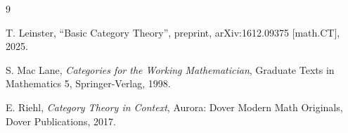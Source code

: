
{}
\begin{thebibliography}{9}

T. Leinster,
``Basic Category Theory'',
preprint, arXiv:1612.09375 [math.CT], 2025.

S. Mac Lane,
\textit{Categories for the Working Mathematician},
Graduate Texts in Mathematics 5, Springer-Verlag, 1998.

E. Riehl,
\textit{Category Theory in Context},
Aurora: Dover Modern Math Originals, Dover Publications, 2017.

\end{thebibliography}
